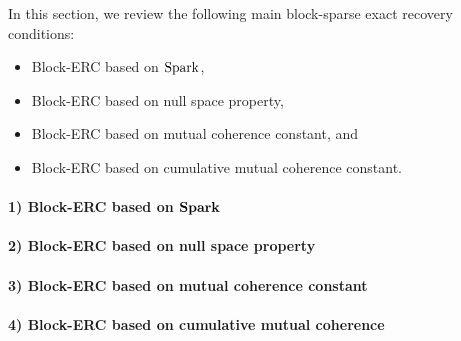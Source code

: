 In this section, we review the following main block-sparse exact recovery conditions:
\begin{itemize}
\item Block-ERC based on $\mathrm{Spark}$,
\item Block-ERC based on null space property,
\item Block-ERC based on mutual coherence constant, and
\item Block-ERC based on cumulative mutual coherence constant.
\end{itemize}
\newpage
\paragraph{1) Block-ERC based on $\boldsymbol{\mathrm{Spark}}$}

\paragraph{2) Block-ERC based on null space property}

\paragraph{3) Block-ERC based on mutual coherence constant}

\paragraph{4) Block-ERC based on cumulative mutual coherence}
